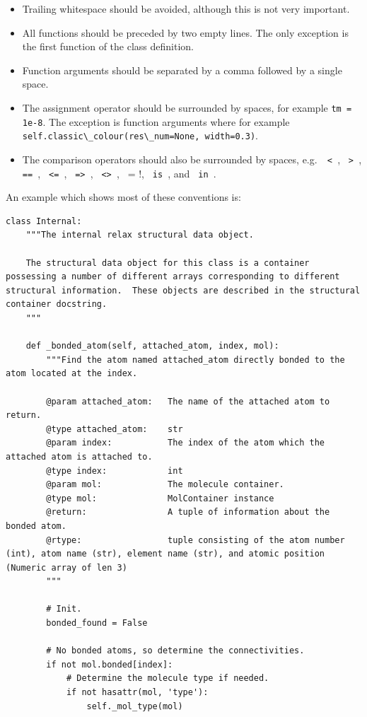 \begin{itemize}
\item Trailing whitespace should be avoided, although this is not very important.
\item All functions should be preceded by two empty lines.  The only exception is the first function of the class definition.
\item Function arguments should be separated by a comma followed by a single space.
\item The assignment operator should be surrounded by spaces, for example \verb*!tm = 1e-8!.  The exception is function arguments where for example \verb*!self.classic\_colour(res\_num=None, width=0.3)!.
\item The comparison operators should also be surrounded by spaces, e.g.\ \verb*! < !, \verb*! > !, \verb*! == !, \verb*! <= !, \verb*! => !, \verb*! <> !, \verb*! != !, \verb*! is !, and \verb*! in !.
\end{itemize}

An example which shows most of these conventions is:
\begin{lstlisting}
class Internal:
    """The internal relax structural data object.

    The structural data object for this class is a container possessing a number of different arrays corresponding to different structural information.  These objects are described in the structural container docstring.
    """

    def _bonded_atom(self, attached_atom, index, mol):
        """Find the atom named attached_atom directly bonded to the atom located at the index.

        @param attached_atom:   The name of the attached atom to return.
        @type attached_atom:    str
        @param index:           The index of the atom which the attached atom is attached to.
        @type index:            int
        @param mol:             The molecule container.
        @type mol:              MolContainer instance
        @return:                A tuple of information about the bonded atom.
        @rtype:                 tuple consisting of the atom number (int), atom name (str), element name (str), and atomic position (Numeric array of len 3)
        """

        # Init.
        bonded_found = False

        # No bonded atoms, so determine the connectivities.
        if not mol.bonded[index]:
            # Determine the molecule type if needed.
            if not hasattr(mol, 'type'):
                self._mol_type(mol)
\end{lstlisting}



